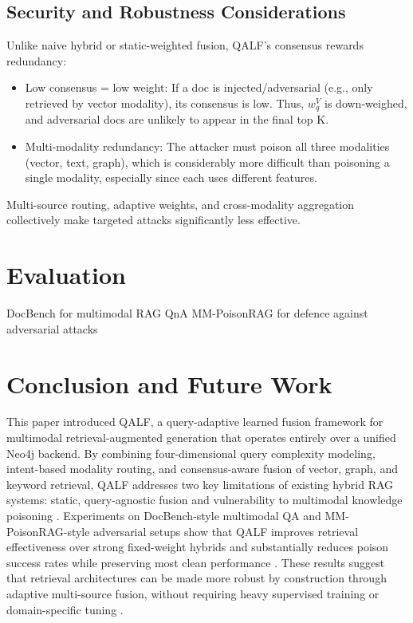 \documentclass[11pt]{article}
\begin{document}
\subsection{Security and Robustness Considerations}

Unlike naive hybrid or static-weighted fusion, QALF’s consensus rewards redundancy:
\begin{itemize}
    \item Low consensus = low weight: If a doc is injected/adversarial (e.g., only retrieved by vector modality), its consensus is low. Thus, \(w_q^V\) is down-weighed, and adversarial docs are unlikely to appear in the final top K.
    \item Multi-modality redundancy: The attacker must poison all three modalities (vector, text, graph), which is considerably more difficult than poisoning a single modality, especially since each uses different features.
\end{itemize}

Multi-source routing, adaptive weights, and cross-modality aggregation collectively make targeted attacks significantly less effective.

\section{Evaluation}
DocBench for multimodal RAG QnA
MM-PoisonRAG for defence against adversarial attacks

\section{Conclusion and Future Work}

This paper introduced QALF, a query-adaptive learned fusion framework for multimodal retrieval-augmented generation that operates entirely over a unified Neo4j backend. By combining four-dimensional query complexity modeling, intent-based modality routing, and consensus-aware fusion of vector, graph, and keyword retrieval, QALF addresses two key limitations of existing hybrid RAG systems: static, query-agnostic fusion and vulnerability to multimodal knowledge poisoning \cite{lee_hybgrag_2025,mei_survey_2025,ha_mm-poisonrag_2025}. Experiments on DocBench-style multimodal QA and MM-PoisonRAG-style adversarial setups show that QALF improves retrieval effectiveness over strong fixed-weight hybrids and substantially reduces poison success rates while preserving most clean performance \cite{ahmad_benchmarking_2025,amirshahi_evaluating_2025}. These results suggest that retrieval architectures can be made more robust by construction through adaptive multi-source fusion, without requiring heavy supervised training or domain-specific tuning \cite{jeong_adaptive-rag_2024,shi_making_2025}.
\end{document}
